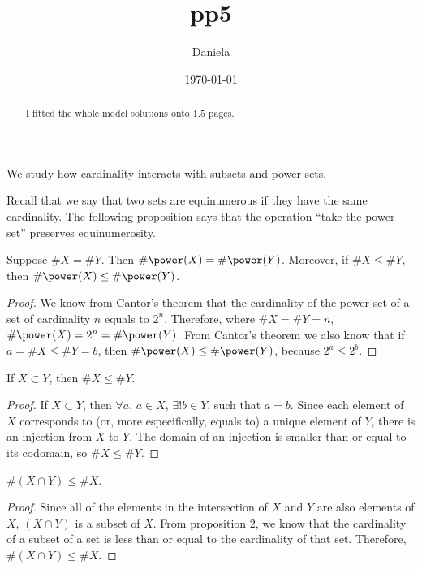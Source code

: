 \documentclass[11pt,reqno,oneside,a4paper]{article}
\title{pp5}
\author{Daniela}
\date{\today}
\begin{document}
\maketitle


\begin{abstract}
	
	
	I fitted the whole model solutions onto $1.5$ pages.
\end{abstract}

We study how cardinality interacts with subsets and power sets.

Recall that we say that two sets are equinumerous if they have the same cardinality.
The following proposition says that the operation ``take the power set'' preserves equinumerosity.
	
\begin{prop} \label{prop:PowerSetsPreserveEquinumerosity}
	Suppose $\# X=\# Y$.
	Then $\# \power(X)=\# \power(Y)$.
	Moreover, if $\# X\leq\# Y$, then $\# \power(X)\leq\# \power(Y)$.
\end{prop}

\begin{proof}
We know from Cantor's theorem that the cardinality of the power set of a set of cardinality $n$ equals to $2^n$. Therefore, where $\# X=\# Y = n $, $\# \power(X)= 2^n = \# \power(Y)$. From Cantor's theorem we also know that  if $a = \# X\leq\# Y = b$, then $\# \power(X)\leq\# \power(Y)$, because $2^a \leq 2^b$.
\end{proof}

\begin{prop} \label{prop:SubsetCardinality}
	If $X\subset Y$, then $\# X\leq \# Y$.
\end{prop}

\begin{proof}
If $X\subset Y$, then $\forall a$, $a \in X$, $	\exists! b \in Y$, such that $a=b$. Since each element of $X$ corresponds to (or, more especifically, equals to) a unique element of $Y$, there is an injection from $X$ to $Y$. The domain of an injection is smaller than or equal to its codomain, so  $\# X\leq \# Y$.
\end{proof}

\begin{cor} \label{cor:IntersectionCardinality}
	$\# (X\cap Y) \leq \# X$.
\end{cor}

\begin{proof}
Since all of the elements in the intersection of $X$ and $Y$ are also elements of $X$, $(X \cap Y)$ is a subset of $X$. From proposition 2, we know that the cardinality of a subset of a set is less than or equal to the cardinality of that set. Therefore, $\#(X\cap Y) \leq \#X$.
\end{proof}
\end{document}
